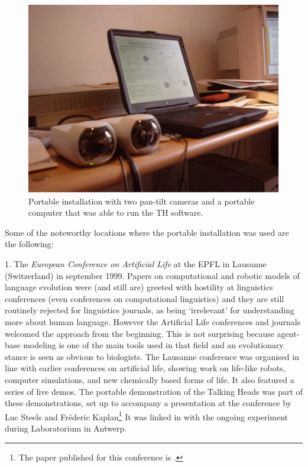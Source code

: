 \begin{figure}[htbp]
  \centerline{\includegraphics[width=.60\textwidth]{chap9/figs/road}}
\caption{\label{fig:road} 
Portable installation with two pan-tilt cameras and a portable computer that was able to run the TH software.}
\end{figure}

Some of the noteworthy locations where the portable installation was used are the following: 

1. The {\itshape European Conference on Artificial Life} at the EPFL in Lausanne (Switzerland) in september 1999. 
Papers on computational and robotic 
models of language evolution were (and still are) greeted with hostility at linguistics conferences (even 
conferences on computational linguistics) and they are still routinely rejected for linguistics journals, as 
being `irrelevant' for understanding more about human language. 
However the Artificial Life conferences and journals welcomed the approach from the beginning. This is 
not surprising because agent-base modeling is one of the main tools used in that field and an evolutionary 
stance is seen as obvious to biologists. The Lausanne conference was organised in line with earlier 
conferences on artificial life, showing work on life-like robots, computer simulations, and new chemically based 
forms of life. It also featured a series of live demos. The portable demonstration of the Talking Heads was part 
of these demonstrations, set up to accompany a presentation at 
the conference by Luc Steels and Fr\'{e}deric Kaplan\footnote{
The paper published for this conference is \cite{Steels:1999}.}
It was linked in with the ongoing experiment during Laboratorium in Antwerp. 

